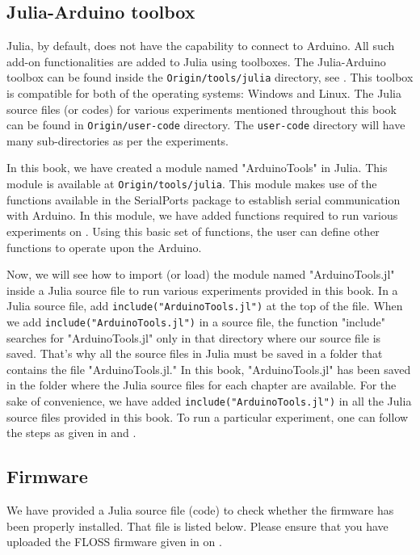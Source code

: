 \subsection{Julia-Arduino toolbox}
\label{sec:julia-toolbox}
Julia, by default, does not have the capability to connect to Arduino.
All such add-on functionalities are added to Julia using toolboxes.
The Julia-Arduino toolbox can be found inside the {\tt Origin/tools/julia} directory,
see .  This toolbox is compatible for both of the operating systems: Windows and Linux.
The Julia source files (or codes) for various experiments mentioned throughout this book can be found in
      {\tt Origin/user-code} directory. The {\tt user-code} directory will have many sub-directories as per the experiments.

In this book, we have created a module named "ArduinoTools" in Julia.  This module is available at
      {\tt Origin/tools/julia}. This module makes use of the functions available in the SerialPorts package to
establish serial communication with Arduino. In this module, we have added functions required to run
various experiments on \arduino. Using this basic set of functions, the user can define other functions to operate
upon the Arduino.


Now, we will see how to import (or load) the module named "ArduinoTools.jl" inside a Julia source file to run
various experiments provided in this book. In a Julia source file, add {\tt include("ArduinoTools.jl")} at the top of the file.
When we add {\tt include("ArduinoTools.jl")} in a source file, the function "include" searches for "ArduinoTools.jl"
only in that directory where our source file is saved. That's why all the source files in Julia
must be saved in a folder that contains the file "ArduinoTools.jl." In this book, "ArduinoTools.jl" has been saved
in the folder where the Julia source files for each chapter are available. For the sake of convenience, we have
added {\tt include("ArduinoTools.jl")} in all the Julia source files provided in this book.
To run a particular experiment, one can follow the steps as given in  and .

\subsection{Firmware}
\lstset{style=mystyle}
\label{sec:test-firmware-julia}
We have provided a Julia source file (code) to check whether the firmware has been
properly installed.  That file is listed below.  Please ensure that
you have uploaded the FLOSS firmware given in  on \arduino.

